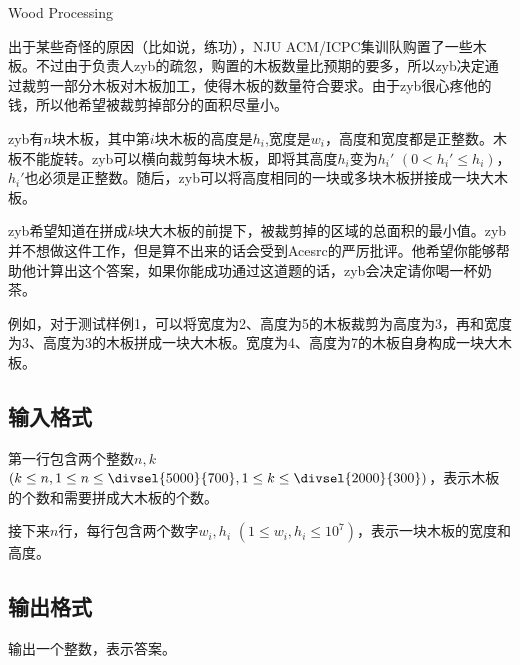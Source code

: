 \begin{Problem}{Wood Processing}{}

出于某些奇怪的原因（比如说，练功），NJU ACM/ICPC集训队购置了一些木板。不过由于负责人zyb的疏忽，购置的木板数量比预期的要多，所以zyb决定通过裁剪一部分木板对木板加工，使得木板的数量符合要求。由于zyb很心疼他的钱，所以他希望被裁剪掉部分的面积尽量小。

zyb有$n$块木板，其中第$i$块木板的高度是$h_i$,宽度是$w_i$，高度和宽度都是正整数。木板不能旋转。zyb可以横向裁剪每块木板，即将其高度$h_i$变为$h_i'$ $(0 < h_i' \leq h_i)$，$h_i'$也必须是正整数。随后，zyb可以将高度相同的一块或多块木板拼接成一块大木板。

zyb希望知道在拼成$k$块大木板的前提下，被裁剪掉的区域的总面积的最小值。zyb并不想做这件工作，但是算不出来的话会受到Acesrc的严厉批评。他希望你能够帮助他计算出这个答案，如果你能成功通过这道题的话，zyb会决定请你喝一杯奶茶。

例如，对于测试样例1，可以将宽度为2、高度为5的木板裁剪为高度为3，再和宽度为3、高度为3的木板拼成一块大木板。宽度为4、高度为7的木板自身构成一块大木板。

\subsection*{输入格式}

第一行包含两个整数$n, k$ $(k \leq n, 1 \leq n \leq \divsel{5000}{700}, 1 \leq k \leq \divsel{2000}{300})$，表示木板的个数和需要拼成大木板的个数。

接下来$n$行，每行包含两个数字$w_i, h_i$ $(1 \leq w_i, h_i \leq 10^7)$，表示一块木板的宽度和高度。

\subsection*{输出格式}

输出一个整数，表示答案。


\end{Problem}

